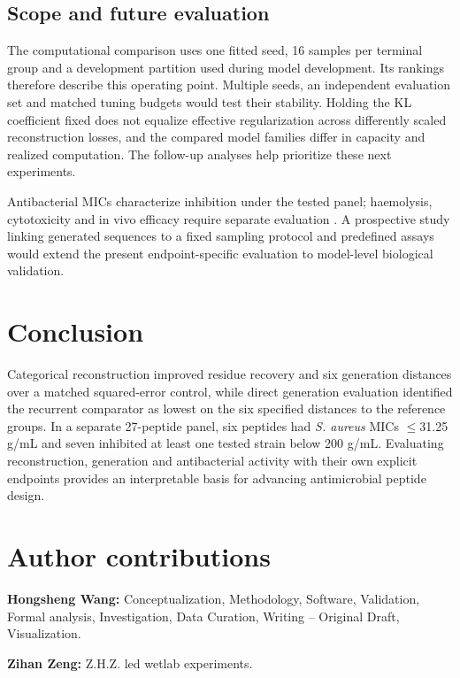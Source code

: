 \documentclass[unnumsec,webpdf,contemporary,large]{oup-authoring-template}
\begin{document}
\subsection{Scope and future evaluation}

The computational comparison uses one fitted seed, 16 samples per terminal group and a development partition used during model development. Its rankings therefore describe this operating point. Multiple seeds, an independent evaluation set and matched tuning budgets would test their stability. Holding the KL coefficient fixed does not equalize effective regularization across differently scaled reconstruction losses, and the compared model families differ in capacity and realized computation. The follow-up analyses help prioritize these next experiments.

Antibacterial MICs characterize inhibition under the tested panel; haemolysis, cytotoxicity and in vivo efficacy require separate evaluation \cite{ref67,ref70}. A prospective study linking generated sequences to a fixed sampling protocol and predefined assays would extend the present endpoint-specific evaluation to model-level biological validation.

\section{Conclusion}

Categorical reconstruction improved residue recovery and six generation distances over a matched squared-error control, while direct generation evaluation identified the recurrent comparator as lowest on the six specified distances to the reference groups. In a separate 27-peptide panel, six peptides had \textit{S. aureus} MICs $\leq$31.25 \textmu{}g/mL and seven inhibited at least one tested strain below 200 \textmu{}g/mL. Evaluating reconstruction, generation and antibacterial activity with their own explicit endpoints provides an interpretable basis for advancing antimicrobial peptide design.

\FloatBarrier
\section*{Author contributions}

\textbf{Hongsheng Wang:} Conceptualization, Methodology, Software, Validation, Formal analysis, Investigation, Data Curation, Writing -- Original Draft, Visualization.

\textbf{Zihan Zeng:} Z.H.Z. led wetlab experiments.
\end{document}
